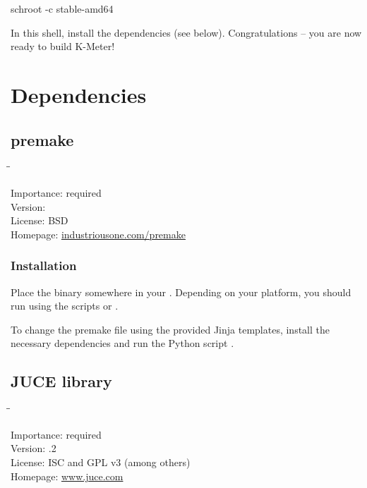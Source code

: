 \begin{Verbatim64}
  schroot -c stable-amd64
\end{Verbatim64}

In this  shell, install the dependencies (see below).
Congratulations -- you are now ready to build K-Meter!

\section{Dependencies}

\subsection{premake}
\label{sec:dependencies_premake}

\begin{tabbing}
  \hspace*{6em}\=\=\kill

  Importance:  \> required \\
  Version:      \\
  License:     \> BSD \\
  Homepage:    \> \href{http://industriousone.com/premake}{industriousone.com/premake}
\end{tabbing}

\subsubsection{Installation}

Place the binary somewhere in your .  Depending on your
platform, you should run  using the scripts
 or .

To change the premake file using the provided Jinja templates, install
the necessary dependencies and run the Python script
.

\newpage %

\subsection{JUCE library}

\begin{tabbing}
  \hspace*{6em}\=\=\kill

  Importance:  \> required \\
  Version:     .2 \\
  License:     \> ISC and GPL v3 (among others) \\
  Homepage:    \> \href{http://www.juce.com/}{www.juce.com}
\end{tabbing}

